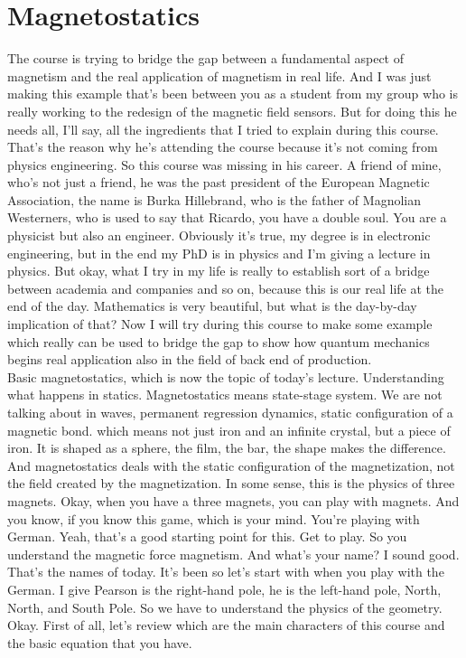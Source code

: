 \chapter{Magnetostatics}
The course is trying to bridge the gap between a fundamental aspect of magnetism and the real application of magnetism in real life. And I was just making this example that's been between you as a student from my group who is really working to the redesign of the magnetic field sensors. But for doing this he needs all, I'll say, all the ingredients that I tried to explain during this course. That's the reason why he's attending the course because it's not coming from physics engineering. So this course was missing in his career. A friend of mine, who's not just a friend, he was the past president of the European Magnetic Association, the name is Burka Hillebrand, who is the father of Magnolian Westerners, who is used to say that Ricardo, you have a double soul. You are a physicist but also an engineer. Obviously it's true, my degree is in electronic engineering, but in the end my PhD is in physics and I'm giving a lecture in physics. But okay, what I try in my life is really to establish sort of a bridge between academia and companies and so on, because this is our real life at the end of the day. Mathematics is very beautiful, but what is the day-by-day implication of that? Now I will try during this course to make some example which really can be used to bridge the gap to show how quantum mechanics begins real application also in the field of back end of production.\\
Basic magnetostatics, which is now the topic of today's lecture. Understanding what happens in statics. Magnetostatics means state-stage system. We are not talking about in waves, permanent regression dynamics, static configuration of a magnetic bond. which means not just iron and an infinite crystal, but a piece of iron. It is shaped as a sphere, the film, the bar, the shape makes the difference. And magnetostatics deals with the static configuration of the magnetization, not the field created by the magnetization. In some sense, this is the physics of three magnets. Okay, when you have a three magnets, you can play with magnets. And you know, if you know this game, which is your mind. You're playing with German. Yeah, that's a good starting point for this. Get to play. So you understand the magnetic force magnetism. And what's your name? I sound good. That's the names of today. It's been so let's start with when you play with the German. I give Pearson is the right-hand pole, he is the left-hand pole, North, North, and South Pole. So we have to understand the physics of the geometry. Okay. First of all, let's review which are the main characters of this course and the basic equation that you have.
